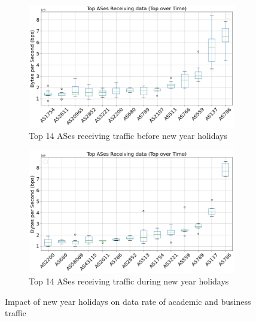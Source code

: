 \documentclass[10pt, journal, letterpaper]{IEEEtran}
\newcommand\linearFigSze{0.48}
\begin{document}
\begin{figure}
    \begin{subfigure}{\linearFigSze\textwidth}
          \centering
          \includegraphics[width=\columnwidth]{img/BCH2_top14AS_recieving_bps.png}
          \caption{Top 14 ASes receiving traffic before new year holidays}
          \label{fig:BCH2_topAS_rec_bps}
    \end{subfigure}
    \begin{subfigure}{\linearFigSze\textwidth}
          \centering
          \includegraphics[width=\columnwidth]{img/CH2_top14AS_recieving_bps.png}
          \caption{Top 14 ASes receiving traffic during new year holidays}
          \label{fig:CH2_topAS_rec_bps}
    \end{subfigure}
    \caption{Impact of new year holidays on data rate of academic and business traffic}
    \label{fig:topAS_rec_BCH_CH}
\end{figure}
\end{document}
